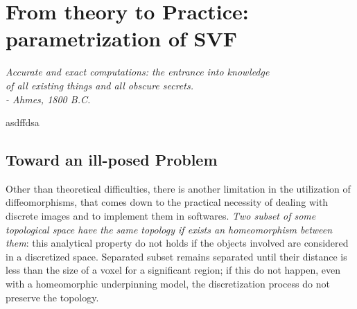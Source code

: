 \chapter{From theory to Practice: parametrization of SVF}\label{ch:to_practice}


\begin{flushright}
	\emph{Accurate and exact computations: the entrance into knowledge \\ of all existing things  and all obscure secrets.\\
		- Ahmes, 1800 B.C.}
\end{flushright}

\vspace{0.6cm}

asdffdsa

\section{Toward an ill-posed Problem}


Other than theoretical difficulties, there is another limitation in the utilization of diffeomorphisms, that comes down to the practical necessity of dealing with discrete images and to implement them in softwares. \emph{Two subset of some topological space have the same topology if exists an homeomorphism between them}: this analytical property do not holds if the objects involved are considered in a discretized space. Separated subset remains separated until their distance is less than the size of a voxel for a significant region; if this do not happen, even with a homeomorphic underpinning model, the discretization process do not preserve the topology.



